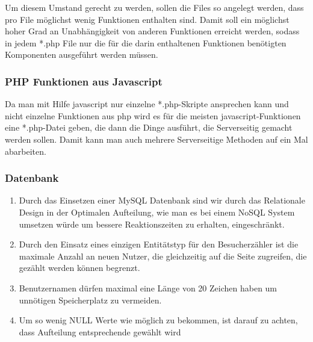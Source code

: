 \documentclass[10pt,a4paper]{scrartcl}
\begin{document}
Um diesem Umstand gerecht zu werden, sollen die Files so angelegt werden, dass pro File möglichst wenig Funktionen enthalten sind.
Damit soll ein möglichst hoher Grad an Unabhängigkeit von anderen Funktionen erreicht werden, sodass in jedem *.php File nur die 
für die darin enthaltenen Funktionen benötigten Komponenten ausgeführt werden müssen.

\subsubsection*{PHP Funktionen aus Javascript}

Da man mit Hilfe javascript nur einzelne *.php-Skripte ansprechen kann und nicht einzelne Funktionen aus php wird es für die meisten javascript-Funktionen eine *.php-Datei geben, die dann die Dinge ausführt, die Serverseitig gemacht werden sollen. Damit kann man auch mehrere Serverseitige Methoden auf ein Mal abarbeiten.


\subsubsection*{Datenbank}

\begin{enumerate}
 \item Durch das Einsetzen einer MySQL Datenbank sind wir durch das Relationale Design in der Optimalen Aufteilung, wie man es bei einem NoSQL System umsetzen würde um bessere Reaktionszeiten zu erhalten, eingeschränkt.
 \item Durch den Einsatz eines einzigen Entitätstyp für den Besucherzähler ist die maximale Anzahl an neuen Nutzer, die gleichzeitig auf die Seite zugreifen, die gezählt werden können begrenzt.
 \item Benutzernamen dürfen maximal eine Länge von 20 Zeichen haben um unnötigen Speicherplatz zu vermeiden.
 \item Um so wenig NULL Werte wie möglich zu bekommen, ist darauf zu achten, dass Aufteilung entsprechende gew\"ahlt wird
\end{enumerate}

\end{document}
